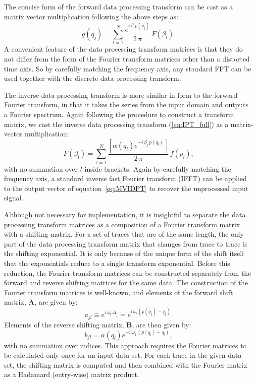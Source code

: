 The concise form of the forward data processing transform can be cast as a matrix vector multiplication following the above steps as:
\begin{equation}
	\label{eq:MVDPT}
	g \left( q_j \right) = \sum _{l=1}^N \frac{e^{i \, \beta_l p \left( q_j \right)}}{2 \, \pi} \, F \left( \beta_l \right).
\end{equation}
A convenient feature of the data processing transform matrices is that they do not differ from the form of the Fourier transform matrices other than a distorted time axis.
So by carefully matching the frequency axis, any standard FFT can be used together with the discrete data processing transform.

The inverse data processing transform is more similar in form to the forward Fourier transform, in that it takes the series from the input domain and outputs a Fourier spectrum.
Again following the procedure to construct a transform matrix, we cast the inverse data processing transform (\ref{eq:IPT_full}) as a matrix-vector multiplication:
\begin{equation}
	\label{eq:MVIDPT}
	F \left( \beta _l \right) = \sum _{l=1}^N \frac{\left[ \alpha \left( q_l\right) e^{-i \, \beta_j \, p \left( q_l \right)} \right]}{2 \, \pi} \, f \left( p_l \right) ,
\end{equation}
with no summation over $l$ inside brackets.
Again by carefully matching the frequency axis, a standard inverse fast Fourier transform (IFFT) can be applied to the output vector of equation~\ref{eq:MVIDPT} to recover the unprocessed input signal.  

Although not necessary for implementation, it is insightful to separate the data processing transform matrices as a composition of a Fourier transform matrix with a shifting matrix.
For a set of traces that are of the same length, the only part of the data processing transform matrix that changes from trace to trace is the shifting exponential.
It is only because of the unique form of the shift itself that the exponentials reduce to a single transform exponential.
Before this reduction, the Fourier transform matrices can be constructed separately from the forward and reverse shifting matrices for the same data.
The construction of the Fourier transform matrices is well-known, and elements of the forward shift matrix, $\mathbf{A}$, are given by:
\begin{equation}
	\label{eq:FSM}
	a_{jl} \equiv e^{i \, \omega_l \, \Delta_j} = e^{i \, \omega_l \left( p \left( q_j \right) - q_j \right)}.
\end{equation}
Elements of the reverse shifting matrix, $\mathbf{B}$, are then given by:
\begin{equation}
	\label{eq:RSM}
	b_{jl} = \alpha \left( q_l \right) e^{-i \, \omega_j \, \left( p \left( q_l \right) - q_l \right)},
\end{equation}
with no summation over indices.
This approach requires the Fourier matrices to be calculated only once for an input data set.
For each trace in the given data set, the shifting matrix is computed and then combined with the Fourier matrix as a Hadamard (entry-wise) matrix product. 

